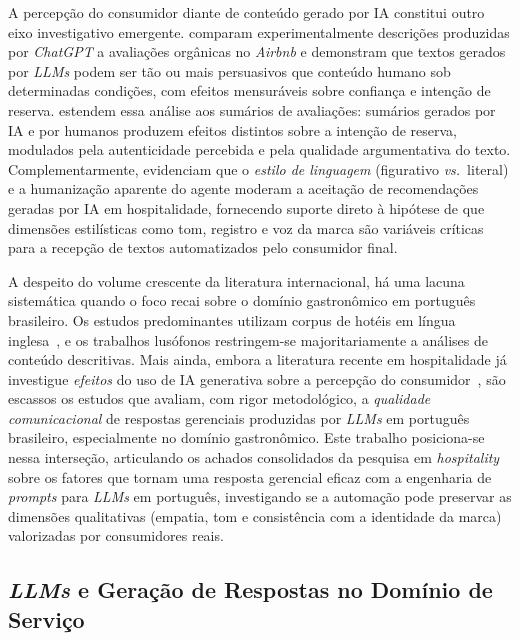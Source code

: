 \documentclass[12pt, a4paper]{article}
\numberwithin{equation}{section}
\begin{document}
A percepção do consumidor diante de conteúdo gerado por IA constitui outro eixo investigativo emergente.  comparam experimentalmente descrições produzidas por \textit{ChatGPT} a avaliações orgânicas no \textit{Airbnb} e demonstram que textos gerados por \textit{LLMs} podem ser tão ou mais persuasivos que conteúdo humano sob determinadas condições, com efeitos mensuráveis sobre confiança e intenção de reserva.  estendem essa análise aos sumários de avaliações: sumários gerados por IA e por humanos produzem efeitos distintos sobre a intenção de reserva, modulados pela autenticidade percebida e pela qualidade argumentativa do texto. Complementarmente,  evidenciam que o \textit{estilo de linguagem} (figurativo \textit{vs.}\ literal) e a humanização aparente do agente moderam a aceitação de recomendações geradas por IA em hospitalidade, fornecendo suporte direto à hipótese de que dimensões estilísticas como tom, registro e voz da marca são variáveis críticas para a recepção de textos automatizados pelo consumidor final.

A despeito do volume crescente da literatura internacional, há uma lacuna sistemática quando o foco recai sobre o domínio gastronômico em português brasileiro. Os estudos predominantes utilizam corpus de hotéis em língua inglesa~\cite{proserpio2017online,liu2018response,sparks2017triple}, e os trabalhos lusófonos restringem-se majoritariamente a análises de conteúdo descritivas. Mais ainda, embora a literatura recente em hospitalidade já investigue \textit{efeitos} do uso de IA generativa sobre a percepção do consumidor~\cite{choi2024chatgpt,jia2025unpacking,ali2025beyond}, são escassos os estudos que avaliam, com rigor metodológico, a \textit{qualidade comunicacional} de respostas gerenciais produzidas por \textit{LLMs} em português brasileiro, especialmente no domínio gastronômico. Este trabalho posiciona-se nessa interseção, articulando os achados consolidados da pesquisa em \textit{hospitality} sobre os fatores que tornam uma resposta gerencial eficaz com a engenharia de \textit{prompts} para \textit{LLMs} em português, investigando se a automação pode preservar as dimensões qualitativas (empatia, tom e consistência com a identidade da marca) valorizadas por consumidores reais.

\subsection{\textit{LLMs} e Geração de Respostas no Domínio de Serviço}
\end{document}
